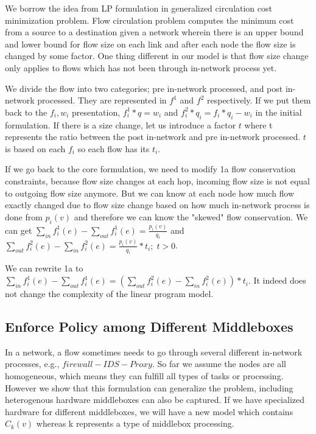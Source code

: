 \documentclass[twocolumn]{article}
\begin{document}
We borrow the idea from LP formulation in generalized circulation cost minimization problem.\cite{Wayne1999} Flow circulation problem computes the minimum cost from a source to a destination given a network wherein there is an upper bound and lower bound for flow size on each link and after each node the flow size is changed by some factor.  One thing different in our model is that flow size change only applies to flows which has not been through in-network process yet. 

We divide the flow into two categories; pre in-network processed, and post in-network processed. They are represented in $f^1$ and $f^2$ respectively. If we put them back to the $f_i, w_i$ presentation, $f_i^1*q=w_i$ and $f_i^2*q_i= f_i *q_i-w_i$ in the initial formulation. If there is a size change, let us introduce a factor $t$ where t represents the ratio between the post in-network and pre in-network processed. $t$ is based on each $f_i$ so each flow has its $t_i$.

If we go back to the core formulation, we need to modify 1a flow conservation constraints, because flow size changes at each hop, incoming flow size is not equal to outgoing flow size anymore. But we can know at each node how much flow exactly changed due to flow size change based on how much in-network process is done from $p_i(v)$ and therefore we can know the "skewed" flow conservation. We can get $\sum\limits_{in} f_i^1(e) - \sum\limits_{out}  f^1_i(e) =\frac{ p_i(v)}{q_i}$ and $\sum\limits_{out} f_i^2(e)-\sum\limits_{in}  f_i^2(e) = \frac{p_i(v)}{q_i}*t_i;\;t>0$. 

We can rewrite 1a to  $\sum\limits_{in} f_i^1(e) - \sum\limits_{out}  f^1_i(e) =(\sum\limits_{out} f_i^2(e)-\sum\limits_{in}  f_i^2(e) )*t_i$. It indeed does not change the complexity of the linear program model.


\subsection{Enforce Policy among Different Middleboxes}\label{Hetero}
In a network, a flow sometimes needs to go through several different in-network processes, e.g., $firewall-IDS-Proxy$. So far we assume the nodes are all homogeneous, which means they can fulfill all types of tasks or processing. However we show that this formulation can generalize the problem, including heterogenous hardware middleboxes can also be captured. If we have specialized hardware for different middleboxes, we will have a new model which contains $C_k(v)$ whereas k represents a type of middlebox processing. 
\end{document}
